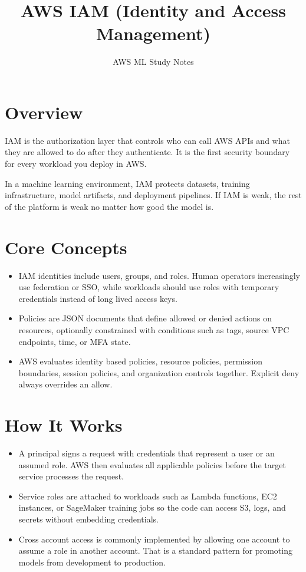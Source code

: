 \documentclass[10pt,twocolumn]{article}
\begin{document}
\title{\vspace{-1.6cm}AWS IAM (Identity and Access Management)}
\author{AWS ML Study Notes}
\date{}
\maketitle
\small

\section*{Overview}
IAM is the authorization layer that controls who can call AWS APIs and what they are allowed to do after they authenticate. It is the first security boundary for every workload you deploy in AWS.

In a machine learning environment, IAM protects datasets, training infrastructure, model artifacts, and deployment pipelines. If IAM is weak, the rest of the platform is weak no matter how good the model is.

\section*{Core Concepts}
\begin{itemize}
\item IAM identities include users, groups, and roles. Human operators increasingly use federation or SSO, while workloads should use roles with temporary credentials instead of long lived access keys.
\item Policies are JSON documents that define allowed or denied actions on resources, optionally constrained with conditions such as tags, source VPC endpoints, time, or MFA state.
\item AWS evaluates identity based policies, resource policies, permission boundaries, session policies, and organization controls together. Explicit deny always overrides an allow.
\end{itemize}

\section*{How It Works}
\begin{itemize}
\item A principal signs a request with credentials that represent a user or an assumed role. AWS then evaluates all applicable policies before the target service processes the request.
\item Service roles are attached to workloads such as Lambda functions, EC2 instances, or SageMaker training jobs so the code can access S3, logs, and secrets without embedding credentials.
\item Cross account access is commonly implemented by allowing one account to assume a role in another account. That is a standard pattern for promoting models from development to production.
\end{itemize}
\end{document}
